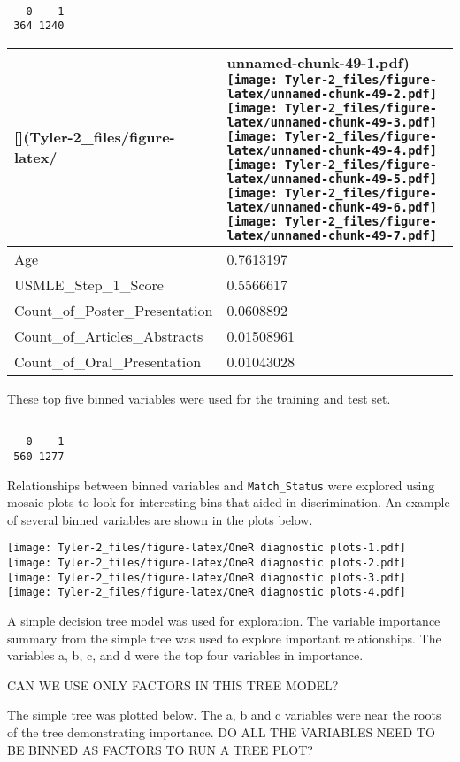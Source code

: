 \documentclass[12pt,]{article}
\begin{document}
\begin{verbatim}

   0    1 
 364 1240 
\end{verbatim}

\begin{longtable}[]{@{}ll@{}}
\toprule
{[}{]}(Tyler-2\_files/figure-latex/ & unnamed-chunk-49-1.pdf)
\texttt{[image: Tyler-2\_files/figure-latex/unnamed-chunk-49-2.pdf]}
\texttt{[image: Tyler-2\_files/figure-latex/unnamed-chunk-49-3.pdf]}
\texttt{[image: Tyler-2\_files/figure-latex/unnamed-chunk-49-4.pdf]}
\texttt{[image: Tyler-2\_files/figure-latex/unnamed-chunk-49-5.pdf]}
\texttt{[image: Tyler-2\_files/figure-latex/unnamed-chunk-49-6.pdf]}
\texttt{[image: Tyler-2\_files/figure-latex/unnamed-chunk-49-7.pdf]}\tabularnewline
\midrule
\endhead
Age & 0.7613197\tabularnewline
USMLE\_Step\_1\_Score & 0.5566617\tabularnewline
Count\_of\_Poster\_Presentation & 0.0608892\tabularnewline
Count\_of\_Articles\_Abstracts & 0.01508961\tabularnewline
Count\_of\_Oral\_Presentation & 0.01043028\tabularnewline
\bottomrule
\end{longtable}

These top five binned variables were used for the training and test set.

\begin{verbatim}

   0    1 
 560 1277 
\end{verbatim}

Relationships between binned variables and \texttt{Match\_Status} were
explored using mosaic plots to look for interesting bins that aided in
discrimination. An example of several binned variables are shown in the
plots below.

\texttt{[image: Tyler-2\_files/figure-latex/OneR diagnostic plots-1.pdf]}
\texttt{[image: Tyler-2\_files/figure-latex/OneR diagnostic plots-2.pdf]}
\texttt{[image: Tyler-2\_files/figure-latex/OneR diagnostic plots-3.pdf]}
\texttt{[image: Tyler-2\_files/figure-latex/OneR diagnostic plots-4.pdf]}

A simple decision tree model was used for exploration. The variable
importance summary from the simple tree was used to explore important
relationships. The variables a, b, c, and d were the top four variables
in importance.

CAN WE USE ONLY FACTORS IN THIS TREE MODEL?

The simple tree was plotted below. The a, b and c variables were near
the roots of the tree demonstrating importance. DO ALL THE VARIABLES
NEED TO BE BINNED AS FACTORS TO RUN A TREE PLOT?
\end{document}
